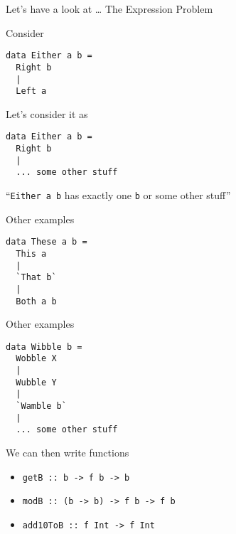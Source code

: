 \begin{frame}
\begin{block}{Let's have a look at \ldots}
The Expression Problem
\end{block}
\end{frame}

\begin{frame}[fragile]
\begin{block}{Consider}
\begin{lstlisting}[style=haskell]
data Either a b =
  Right b
  |
  Left a
\end{lstlisting}
\end{block}
\end{frame}

\begin{frame}[fragile]
\begin{block}{Let's consider it as}
\begin{lstlisting}[style=haskell]
data Either a b =
  Right b
  |
  ... some other stuff
\end{lstlisting}
\end{block}
\end{frame}

\begin{frame}[fragile]
\begin{block}{}
``\lstinline{Either a b} has exactly one \lstinline{b} or some other stuff''
\end{block}
\end{frame}

\begin{frame}[fragile]
\begin{block}{Other examples}
\begin{lstlisting}[style=haskell]
data These a b =
  This a
  |
  `That b`
  |
  Both a b
\end{lstlisting}
\end{block}
\end{frame}

\begin{frame}[fragile]
\begin{block}{Other examples}
\begin{lstlisting}[style=haskell]
data Wibble b =
  Wobble X
  |
  Wubble Y
  |
  `Wamble b`
  |
  ... some other stuff
\end{lstlisting}
\end{block}
\end{frame}

\begin{frame}[fragile]
\begin{block}{We can then write functions}
\begin{itemize}
\item<1-> \lstinline{getB :: b -> f b -> b}
\item<2-> \lstinline{modB :: (b -> b) -> f b -> f b}
\item<3-> \lstinline{add10ToB :: f Int -> f Int}
\end{itemize}
\end{block}
\end{frame}

